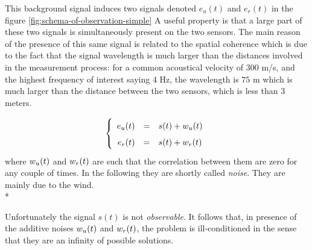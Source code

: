 This  background signal  induces two  signals denoted $e_{u}(t)$ and $e_{r}(t)$ in the figure \ref{fig:schema-of-observation-simple}
A useful property is that a large part of these two signals is simultaneously present  on the two sensors. The main reason of the presence of this same signal is related to the spatial coherence which is due to the fact that the signal wavelength is much larger than the distances  involved in the measurement process: for a common acoustical velocity of $300$ m/s, and the highest frequency of interest saying $4$ Hz, the wavelength is $75$ m which is much larger than the distance between the two sensors, which is less than 3 meters. 

\begin{eqnarray}
\label{eq:model-signal-introduction}
\left\{
\renewcommand\arraystretch{1.6}
\begin{array}{rcl}
e_{\ut}(t)&=&s(t)+w_{\ut}(t)
\\
e_{\rf}(t)&=&s(t)+w_{\rf}(t)
\end{array}
\right.
\end{eqnarray}
where $w_{{u}}(t)$ and $w_{{r}}(t)$ are such that the correlation between them are zero for any couple of times. In the following they are shortly called \emph{noise}.  They are mainly due to the wind.\\*

Unfortunately the signal $s(t)$ is not  \emph{observable}. It follows that, in presence of the additive noises $w_{{u}}(t)$ and $w_{{r}}(t)$, the problem is ill-conditioned in the sense that they are an infinity of possible solutions.







